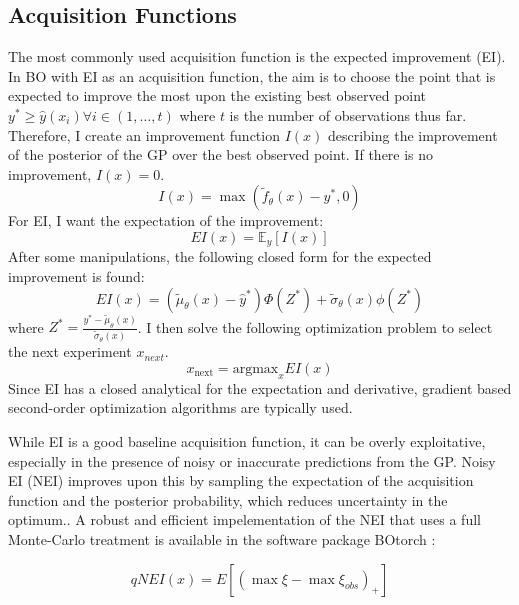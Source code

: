 \subsection{Acquisition Functions}

The most commonly used acquisition function is the expected improvement (EI). In BO with EI as an acquisition function, the aim is to choose the point that is expected to improve the most upon the existing best observed point $y^* \geq \hat y(x_i) \forall i \in (1, \dots, t)$  where  $t$ is the number of observations thus far. Therefore, I create an improvement function $I(x)$ describing the improvement of the posterior of the GP over the best observed point. If there is no improvement, $I(x)=0$.
\begin{equation}
    I(x) = \max(\tilde f_{\theta}(x) -y^*, 0)
\end{equation}
For EI, I want the expectation of the improvement:
\begin{equation}
    EI(x) = \mathbb E_{y}[I(x)]
\end{equation}
After some manipulations, the following closed form for the expected improvement is found:
\begin{equation}
    EI(x) =(\tilde \mu_{\theta}(x)-\hat y^*)\Phi(Z^*) + \tilde \sigma_{\theta}(x) \phi(Z^*)
\end{equation}
where $Z^*= \frac{y^*-\tilde\mu_{\theta}(x)}{\tilde \sigma_{\theta}(x)}$.  I then solve the following optimization problem to select the next experiment $x_{next}$.
\begin{equation}
    x_{\text{next}} = \text{argmax}_{x} EI(x)
\end{equation}
Since EI has a closed analytical for the expectation and derivative, gradient based second-order optimization algorithms are typically used. 

While EI is a good baseline acquisition function, it can be overly exploitative, especially in the presence of noisy or inaccurate predictions from the GP.  Noisy EI (NEI) improves upon this by sampling the expectation of the acquisition function and the posterior probability, which reduces uncertainty in the optimum.\cite{Letham2019}. A robust and efficient impelementation of the NEI that uses a full Monte-Carlo treatment is available in the software package BOtorch \cite{Balandat2020}:

\begin{equation}
qNEI(x)= E[(\max \xi  - \max \xi_{obs} )_+]
\end{equation}

